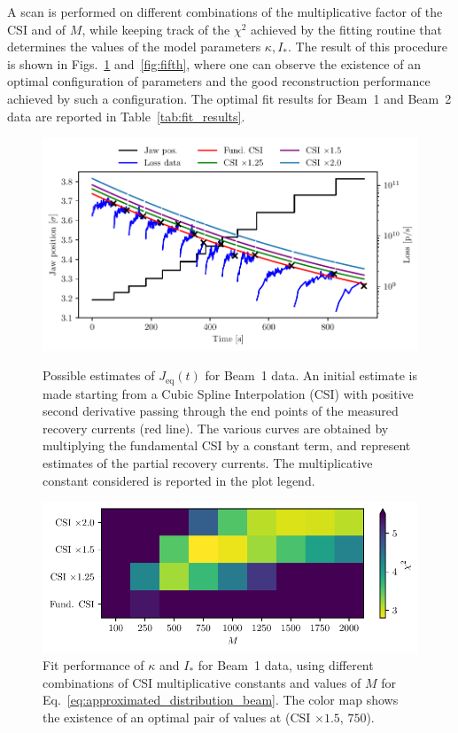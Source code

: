 A scan is performed on different combinations of the multiplicative factor of the CSI and of $M$, while keeping track of the $\chi^2$ achieved by the fitting routine that determines the values of the model parameters $\kappa, I_\ast$. The result of this procedure is shown in Figs.~\ref{fig:fourth} and~\ref{fig:fifth}, where one can observe the existence of an optimal configuration of parameters and the good reconstruction performance achieved by such a configuration. The optimal fit results for Beam~1 and Beam~2 data are reported in Table~\ref{tab:fit_results}.

\begin{figure}[p]
    \centering
    \includegraphics[trim={0 2.5mm 0 3mm}, clip, width=\columnwidth]{5_Diffusion_measurement_LHC/figs/second_bis.pdf}
    \caption{Possible estimates of $J_\mathrm{eq}(t)$ for Beam~1 data. An initial estimate is made starting from a Cubic Spline Interpolation (CSI) with positive second derivative passing through the end points of the measured recovery currents (red line). The various curves are obtained by multiplying the fundamental CSI by a constant term, and represent estimates of the partial recovery currents. The multiplicative constant considered is reported in the plot legend.}
    \label{fig:second}
    \vspace{\floatsep}
    \includegraphics[trim={0 2.5mm 0 1.5mm}, clip, width=0.98\columnwidth]{5_Diffusion_measurement_LHC/figs/fourth.pdf}
    \caption{Fit performance of $\kappa$ and $I_\ast$ for Beam~1 data, using different combinations of CSI multiplicative constants and values of $M$ for Eq.~\eqref{eq:approximated_distribution_beam}. The color map shows the existence of an optimal pair of values at (CSI $\times 1.5$, $750$).}
    \label{fig:fourth}
\end{figure}
